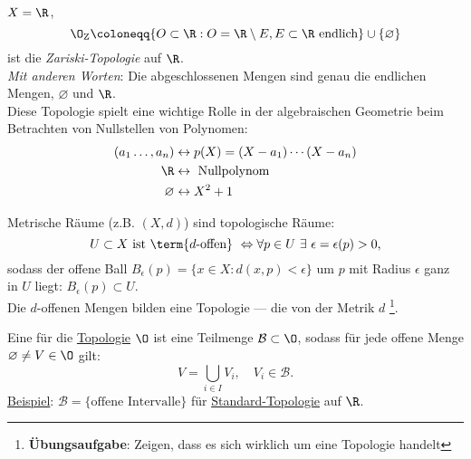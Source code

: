 \begin{example}\label{bsp:zariskitopologie}
  \( X = \R \),
  \begin{equation*}
    \O_\text{Z} \coloneqq \{ O \subset \R : O = \R \setminus E, E \subset \R \text{ endlich} \} \cup \{ \varnothing \}
  \end{equation*}
  ist die \emph{Zariski-Topologie} auf \( \R \). \\
  \emph{Mit anderen Worten}: Die abgeschlossenen Mengen sind genau die endlichen Mengen, \( \varnothing \) und \( \R \). \\
  Diese Topologie spielt eine wichtige Rolle in der algebraischen Geometrie beim Betrachten von Nullstellen von Polynomen: \\
  \begin{align*}
    (a_1 \dots, a_n) &\leftrightarrow p(X) = (X-a_1)\cdots(X-a_n) \\
     \R &\leftrightarrow \text{ Nullpolynom} \\
     \varnothing &\leftrightarrow X^2+1
  \end{align*}
\end{example}

\begin{definition}\label{def:induzierteTopologie}
  Metrische Räume (z.B. \( (X, d) \)) sind topologische Räume: \\
  \begin{equation*}
    U \subset X \text{ ist \term{\( d \)-offen} } \Leftrightarrow \forall p \in U \ \exists \ \epsilon = \epsilon(p) > 0\text{,}
  \end{equation*}
  sodass der offene Ball \( B_\epsilon(p) = \{ x \in X : d(x,p) < \epsilon \} \) um \( p \) mit Radius \( \epsilon \) ganz in \( U \) liegt: \( B_\epsilon(p) \subset U \). \\
  Die \( d \)-offenen Mengen bilden eine Topologie --- die von der Metrik \( d \) \footnote{\textbf{Übungsaufgabe}: Zeigen, dass es sich wirklich um eine Topologie handelt}.
\end{definition}

\begin{definition}[Basis]\label{def:basis}
  Eine  für die \hyperref[def:topologie]{Topologie} \( \O \) ist eine Teilmenge \( \mathcal{B} \subset \O \), sodass für jede offene Menge \( \varnothing \neq V \in \O \) gilt:
  \begin{equation*}
    V = \bigcup_{i \in I}V_i, \quad V_i \in \mathcal{B}\text{.}
  \end{equation*}
  \underline{Beispiel}: \( \mathcal{B} = \{ \text{offene Intervalle} \} \) für \hyperref[bsp:standardtopologie]{Standard-Topologie} auf \( \R \).
\end{definition}

